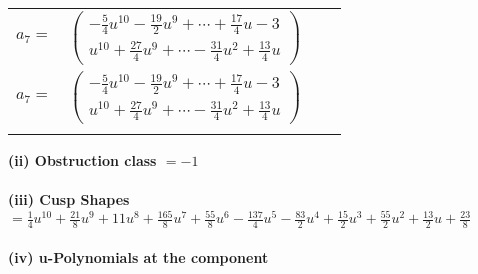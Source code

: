 \documentclass[1p]{elsarticle_modified}
\theoremstyle{definition}
\begin{document}
\begin{tabular}{m{7pt} m{180pt} m{7pt} m{180pt} }
\flushright $a_{7}=$&$\begin{pmatrix}-\frac{5}{4} u^{10}-\frac{19}{2} u^9+\cdots+\frac{17}{4} u-3\\u^{10}+\frac{27}{4} u^9+\cdots-\frac{31}{4} u^2+\frac{13}{4} u\end{pmatrix}$\\ \flushright $a_{7}=$&$\begin{pmatrix}-\frac{5}{4} u^{10}-\frac{19}{2} u^9+\cdots+\frac{17}{4} u-3\\u^{10}+\frac{27}{4} u^9+\cdots-\frac{31}{4} u^2+\frac{13}{4} u\end{pmatrix}$\\&\end{tabular}
\flushleft \textbf{(ii) Obstruction class $= -1$}\\~\\
\flushleft \textbf{(iii) Cusp Shapes $= \frac{1}{4} u^{10}+\frac{21}{8} u^9+11 u^8+\frac{165}{8} u^7+\frac{55}{8} u^6-\frac{137}{4} u^5-\frac{83}{2} u^4+\frac{15}{2} u^3+\frac{55}{2} u^2+\frac{13}{2} u+\frac{23}{8}$}\\~\\
\newpage\renewcommand{\arraystretch}{1}
\flushleft \textbf{(iv) u-Polynomials at the component}\newline \\
\end{document}
